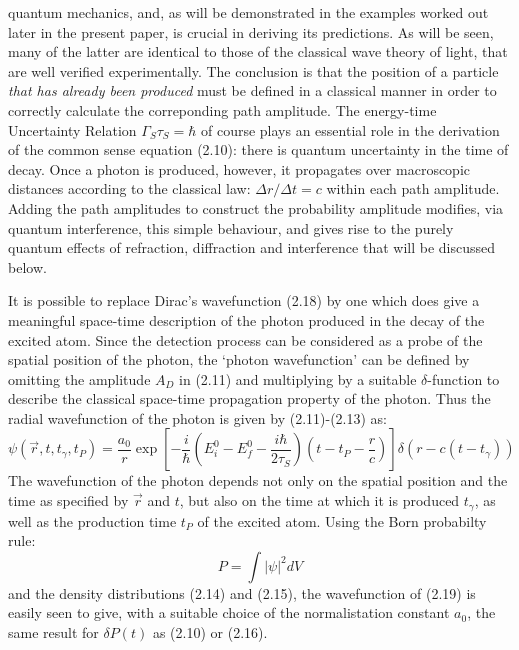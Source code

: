 \documentclass [12pt]{article}
\begin{document}
{   quantum mechanics, and, as will be demonstrated in the examples worked out later in the present
   paper, is  crucial in deriving its predictions. As will be seen, many of the latter are identical
   to those of the classical wave theory of light, that are well verified experimentally.
    The conclusion is that the position
   of a particle {\it that has already been produced} must be defined in a classical manner in order
    to correctly calculate the correponding path amplitude.
     The energy-time Uncertainty Relation $\Gamma_S \tau_S = \hbar$ of course plays an essential
    role in the derivation of the common sense equation (2.10): there is quantum uncertainty
    in the time of decay. Once a photon is produced, however, it propagates over macroscopic
    distances according to the classical law: $\Delta r / \Delta t =c$ within each path amplitude.
    Adding the path amplitudes to construct the probability amplitude modifies, via quantum 
    interference, this simple behaviour, and gives rise to the purely quantum effects of refraction,
    diffraction and interference that will be discussed below.
    \par It is possible to replace Dirac's wavefunction (2.18) by one which does give 
   a meaningful space-time description of the photon produced in the decay of the excited atom. 
     Since the detection process can be considered as a probe of the spatial position of the
    photon, the `photon wavefunction' can be defined by omitting the amplitude $A_D$ in (2.11) 
    and multiplying by a suitable $\delta$-function to describe the classical space-time
    propagation property of the photon. Thus the radial wavefunction of the photon 
    is given by (2.11)-(2.13) as:
  \begin{equation}
  \psi(\vec{r},t,t_{\gamma},t_P) =  \frac{a_0}{r}
   \exp\left[-\frac{i}{\hbar}\left(E_i^0- E_f^0 -\frac{i\hbar}{2\tau_S}\right)
   \left(t-t_P-\frac{r}{c}\right)\right] \delta(r-c(t-t_{\gamma}))
   \end{equation} 
    The wavefunction of the photon  depends not only on the spatial position and the time
    as specified by $\vec{r}$ and $t$, but also on the time at which it is produced $t_{\gamma}$, as well 
   as the production time $t_P$ of the excited atom. Using the Born probabilty rule:
  \[  P = \int |\psi|^2 dV \]
    and the density distributions (2.14) and (2.15), the wavefunction of (2.19) is easily seen to give,
    with a suitable
    choice of the normalistation constant $a_0$, the same result for $\delta P(t)$ as (2.10) or (2.16).

}
\end{document}
